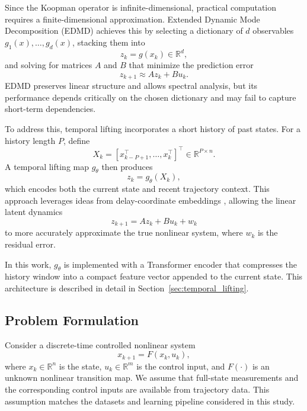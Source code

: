 \documentclass[journal]{IEEEtran}
\begin{document}
Since the Koopman operator is infinite-dimensional, practical computation requires a finite-dimensional approximation. Extended Dynamic Mode Decomposition (EDMD) achieves this by selecting a dictionary of $d$ observables $g_1(x),\ldots,g_d(x)$, stacking them into
\begin{equation}
    z_k = g(x_k) \in \mathbb{R}^d,
    \label{eq:instantaneous_lifting}
\end{equation}
and solving for matrices $A$ and $B$ that minimize the prediction error
\begin{equation}
    z_{k+1} \approx A z_k + B u_k.
    \label{eq:learned_dynamics}
\end{equation}
EDMD preserves linear structure and allows spectral analysis, but its performance depends critically on the chosen dictionary and may fail to capture short-term dependencies.

To address this, temporal lifting incorporates a short history of past states. For a history length $P$, define
\begin{equation}
    X_k = [x_{k-P+1}^\top, \ldots, x_k^\top]^\top \in \mathbb{R}^{P\times n}.
    \label{eq:history_window}
\end{equation}
A temporal lifting map $g_\theta$ then produces
\begin{equation}
    z_k = g_\theta(X_k),
    \label{eq:temporal_lifting}
\end{equation}
which encodes both the current state and recent trajectory context. This approach leverages ideas from delay-coordinate embeddings \cite{arbabi2017ergodic, rank2019recurrent}, allowing the linear latent dynamics
\begin{equation}
    z_{k+1} = A z_k + B u_k + w_k
\end{equation}
to more accurately approximate the true nonlinear system, where $w_k$ is the residual error.

In this work, $g_\theta$ is implemented with a Transformer encoder that compresses the history window into a compact feature vector appended to the current state. This architecture is described in detail in Section~\ref{sec:temporal_lifting}.


\subsection{Problem Formulation}
\label{sec:problem}

Consider a discrete-time controlled nonlinear system
\begin{equation}
    x_{k+1} = F(x_k,u_k),
    \label{eq:nonlinear_system}
\end{equation}
where $x_k \in \mathbb{R}^n$ is the state, $u_k \in \mathbb{R}^m$ is the control input, and $F(\cdot)$ is an unknown nonlinear transition map. We assume that full-state measurements and the corresponding control inputs are available from trajectory data. This assumption matches the datasets and learning pipeline considered in this study.
\end{document}
